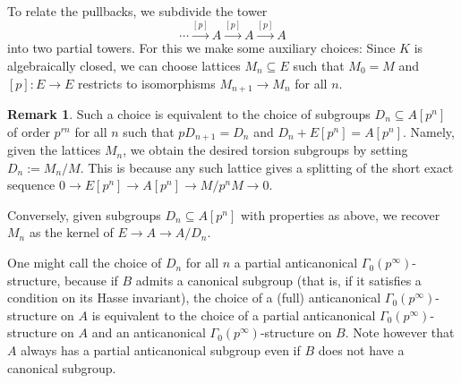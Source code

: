 \documentclass[10pt,oneside]{amsart}
\theoremstyle{definition}
\newtheorem{remark}[theorem]{Remark}
\begin{document}
To relate the pullbacks, we subdivide the tower 
\[
\cdots\xrightarrow{[p]}A \xrightarrow{[p]}A\xrightarrow{[p]}A
\]
into two partial towers. For this we make some auxiliary choices: Since $K$ is algebraically closed, we can choose lattices $M_n\subseteq E$ such that $M_0=M$ and $[p]\colon E\rightarrow E$ restricts to isomorphisms $M_{n+1}\rightarrow M_n$ for all $n$.
	
	\begin{remark}\label{remark: Definition of the D_n}
		Such a choice is equivalent to the choice of subgroups $D_n\subseteq A[p^n]$ of order $p^{rn}$ for all $n$ such that $pD_{n+1}=D_n$ and $D_n+E[p^n]=A[p^n]$. Namely,
		given the lattices $M_{n}$, we obtain the desired torsion subgroups by setting $D_n:=M_{n}/M$. This is because any such lattice gives a splitting of the short exact sequence $0\rightarrow E[p^n]\rightarrow A[p^n]\rightarrow M/p^nM \rightarrow 0$.
		
		Conversely, given subgroups $D_n\subseteq A[p^n]$ with properties as above, we recover $M_n$ as the kernel of $E\rightarrow A\rightarrow A/D_n$.
		
		One might call the choice of $D_n$ for all $n$ a partial anticanonical $\Gamma_0(p^\infty)$-structure, because if $B$ admits a canonical subgroup (that is, if it satisfies a condition on its Hasse invariant), the choice of a (full) anticanonical $\Gamma_0(p^\infty)$-structure on $A$ is equivalent to the choice of a partial anticanonical $\Gamma_0(p^\infty)$-structure on $A$ and an anticanonical $\Gamma_0(p^\infty)$-structure on $B$. Note however that $A$ always has a partial anticanonical subgroup even if $B$ does not have a canonical subgroup.
	\end{remark}
	
\end{document}
